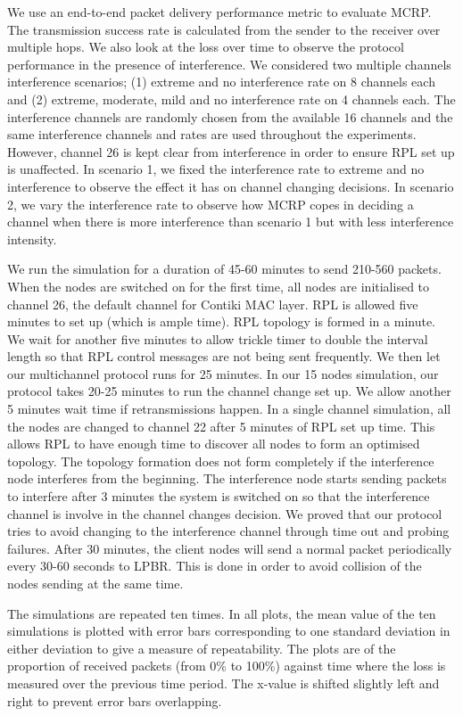 We use an end-to-end packet delivery performance metric to evaluate MCRP. The transmission success rate is calculated from the sender to the receiver over multiple hops. We also look at the loss over time to observe the protocol performance in the presence of interference. We considered two multiple channels interference scenarios; (1) extreme and no interference rate on 8 channels each and (2) extreme, moderate, mild and no interference rate on 4 channels each. The interference channels are randomly chosen from the available 16 channels and the same interference channels and rates are used throughout the experiments. However, channel 26 is kept clear from interference in order to ensure RPL set up is unaffected. In scenario 1, we fixed the interference rate to extreme and no interference to observe the effect it has on channel changing decisions. In scenario 2, we vary the interference rate to observe how MCRP copes in deciding a channel when there is more interference than scenario 1 but with less interference intensity. 

We run the simulation for a duration of 45-60 minutes to send 210-560 packets. When the nodes are switched on for the first time, all nodes are initialised to channel 26, the default channel for Contiki MAC layer. RPL is allowed five minutes to set up (which is ample time). RPL topology is formed in a minute. We wait for another five minutes to allow trickle timer to double the interval length so that RPL control messages are not being sent frequently. We then let our multichannel protocol runs for 25 minutes. In our 15 nodes simulation, our protocol takes 20-25 minutes to run the channel change set up. We allow another 5 minutes wait time if retransmissions happen. 
In a single channel simulation, all the nodes are changed to channel 22 after 5 minutes of RPL set up time. This allows RPL to have enough time to discover all nodes to form an optimised topology. The topology formation does not form completely if the interference node interferes from the beginning. The interference node starts sending packets to interfere after 3 minutes the system is switched on so that the interference channel is involve in the channel changes decision. We proved that our protocol tries to avoid changing to the interference channel through time out and probing failures. After 30 minutes, the client nodes will send a normal packet periodically every 30-60 seconds to LPBR. This is done in order to avoid collision of the nodes sending at the same time. 

The simulations are repeated ten times. In all plots, the mean value of the ten simulations is plotted with error bars corresponding to one standard deviation in either deviation to give a measure of repeatability. The plots are of the proportion of received packets (from 0\% to 100\%) against time where the loss is measured over the previous time period.  The x-value is shifted slightly left and right to prevent error bars overlapping.

